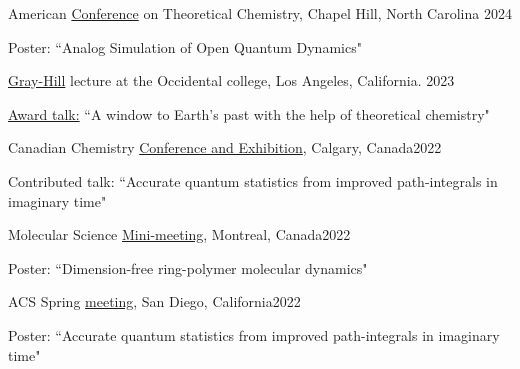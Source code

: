 \documentclass[margin,line]{res}
\newenvironment{list1}{
  \begin{list}{\ding{113}}{%
      \setlength{\itemsep}{0in}
      \setlength{\parsep}{0in} \setlength{\parskip}{0in}
      \setlength{\topsep}{0in} \setlength{\partopsep}{0in} 
      \setlength{\leftmargin}{0.17in}}}{\end{list}}
\begin{document}
\begin{resume}
\vspace*{-1mm}

American \href{https://www.actc2024.org/}{Conference} on Theoretical Chemistry, Chapel Hill, North Carolina \hfill{2024}

\begin{list1}
\item[]Poster: ``Analog Simulation of Open Quantum Dynamics"
\end{list1}

\vspace*{-1mm}

\href{https://www.oxy.edu/academics/student-research/urc/2023-summer-research-program}{Gray-Hill} lecture at the Occidental college, Los Angeles, California.  \hfill{2023}

\begin{list1}
\item[]\underline{Award talk:} ``A window to Earth's past with the help of theoretical chemistry"
\end{list1}

\vspace*{-1mm}

Canadian Chemistry \href{https://www.cheminst.ca/conference/canadian-chemistry-conference-and-exhibition/}{Conference and Exhibition}, Calgary, Canada\hfill {2022}

\begin{list1}
\item[]Contributed talk: ``Accurate quantum statistics from improved path-integrals in imaginary time" 
\end{list1}
\vspace*{-1mm}

Molecular Science \href{https://www.siminegroup.ca/mms/mms2022}{Mini-meeting}, Montreal, Canada\hfill{2022}

\begin{list1}
\item[]Poster: ``Dimension-free ring-polymer molecular dynamics"
\end{list1}

\vspace*{-1mm}

ACS Spring \href{https://www.morressier.com/o/event/623377e0b300ee00119b311f}{meeting}, San Diego, California\hfill{2022}

\begin{list1}
\item[]Poster: ``Accurate quantum statistics from improved path-integrals in imaginary time"
\end{list1}


\end{resume}
\end{document}
